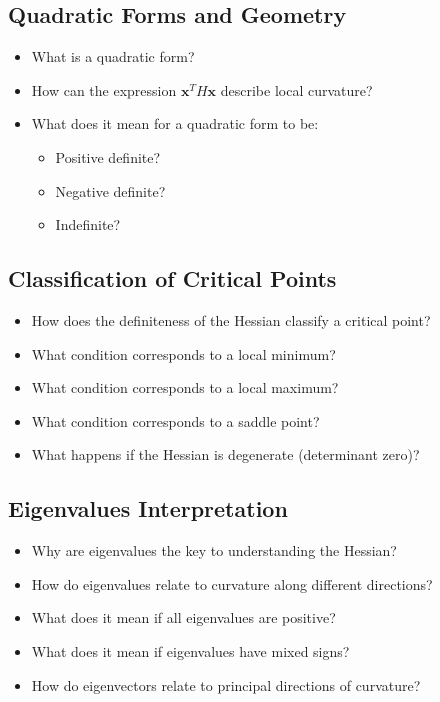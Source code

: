 \subsection{Quadratic Forms and Geometry}

\begin{itemize}
  \item What is a quadratic form?
  \item How can the expression $\mathbf{x}^T H \mathbf{x}$ describe local curvature?
  \item What does it mean for a quadratic form to be:
    \begin{itemize}
      \item Positive definite?
      \item Negative definite?
      \item Indefinite?
    \end{itemize}
\end{itemize}

\subsection{Classification of Critical Points}

\begin{itemize}
  \item How does the definiteness of the Hessian classify a critical point?
  \item What condition corresponds to a local minimum?
  \item What condition corresponds to a local maximum?
  \item What condition corresponds to a saddle point?
  \item What happens if the Hessian is degenerate (determinant zero)?
\end{itemize}

\subsection{Eigenvalues Interpretation}

\begin{itemize}
  \item Why are eigenvalues the key to understanding the Hessian?
  \item How do eigenvalues relate to curvature along different directions?
  \item What does it mean if all eigenvalues are positive?
  \item What does it mean if eigenvalues have mixed signs?
  \item How do eigenvectors relate to principal directions of curvature?
\end{itemize}

